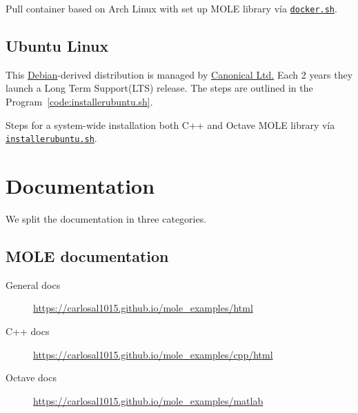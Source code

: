\begin{listing}[ht!]
	\tiny
	\centering
	\caption{Pull container based on Arch Linux with set up MOLE
		library vía \href{https://raw.githubusercontent.com/carlosal1015/mole_examples/main/tutorial/docker.sh}{\texttt{docker.sh}}.}
	\label{code:docker.sh}
\end{listing}

\section{Ubuntu Linux}

This \href{https://www.debian.org}{Debian}-derived distribution is
managed by \href{https://canonical.com}{Canonical Ltd.}
Each 2 years they launch a Long Term Support(LTS) release.
The steps are outlined in the Program~\ref{code:installerubuntu.sh}.

\begin{listing}[ht!]
	\tiny
	\centering
	\caption{Steps for a system-wide installation both C++ and Octave
		MOLE library vía \href{https://raw.githubusercontent.com/carlosal1015/mole_examples/main/tutorial/installerubuntu.sh}{\texttt{installerubuntu.sh}}.}
	\label{code:installerubuntu.sh}
\end{listing}

\chapter{Documentation}

We split the documentation in three categories.

\section{MOLE documentation}

\begin{description}
	\item[General docs]

	      \url{https://carlosal1015.github.io/mole_examples/html}

	\item[C++ docs]

	      \url{https://carlosal1015.github.io/mole_examples/cpp/html}

	\item[Octave docs]

	      \url{https://carlosal1015.github.io/mole_examples/matlab}
\end{description}

